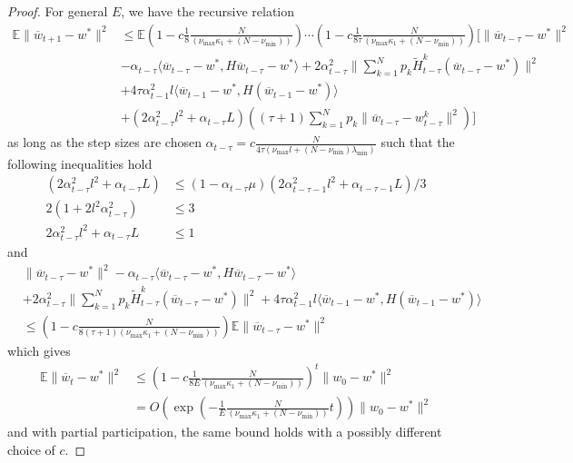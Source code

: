 \begin{proof}
	For general $E$, we have the recursive relation
	\begin{align*}
	\mathbb{E}\|\overline{w}_{t+1}-w^{\ast}\|^{2} & \leq\mathbb{E}(1-c\frac{1}{8}\frac{N}{(\nu_{\max}\kappa_{1}+(N-\nu_{\min}))})\cdots(1-c\frac{1}{8\tau}\frac{N}{(\nu_{\max}\kappa_{1}+(N-\nu_{\min}))})[\|\overline{w}_{t-\tau}-w^{\ast}\|^{2}\\
	& -\alpha_{t-\tau}\langle\overline{w}_{t-\tau}-w^{\ast},H\overline{w}_{t-\tau}-w^{\ast}\rangle+2\alpha_{t-\tau}^{2}\|\sum_{k=1}^{N}p_{k}\tilde{H}_{t-\tau}^{k}(\overline{w}_{t-\tau}-w^{\ast})\|^{2}\\
	& +4\tau\alpha_{t-1}^{2}l\langle\overline{w}_{t-1}-w^{\ast},H(\overline{w}_{t-1}-w^{\ast})\rangle\\
	& +(2\alpha_{t-\tau}^{2}l^{2}+\alpha_{t-\tau}L)((\tau+1)\sum_{k=1}^{N}p_{k}\|\overline{w}_{t-\tau}-w_{t-\tau}^{k}\|^{2})]
	\end{align*}
	as long as the step sizes are chosen $\alpha_{t-\tau}=c\frac{N}{4\tau(\nu_{\max}l+(N-\nu_{\min})\lambda_{\min})}$
	such that the following inequalities hold 
	\begin{align*}
	(2\alpha_{t-\tau}^{2}l^{2}+\alpha_{t-\tau}L) & \leq(1-\alpha_{t-\tau}\mu)(2\alpha_{t-\tau-1}^{2}l^{2}+\alpha_{t-\tau-1}L)/3\\
	2(1+2l^{2}\alpha_{t-\tau}^{2}) & \leq3\\
	2\alpha_{t-\tau}^{2}l^{2}+\alpha_{t-\tau}L & \leq1
	\end{align*}
	and 
	\begin{align*}
	& \|\overline{w}_{t-\tau}-w^{\ast}\|^{2}-\alpha_{t-\tau}\langle\overline{w}_{t-\tau}-w^{\ast},H\overline{w}_{t-\tau}-w^{\ast}\rangle\\
	& +2\alpha_{t-\tau}^{2}\|\sum_{k=1}^{N}p_{k}\tilde{H}_{t-\tau}^{k}(\overline{w}_{t-\tau}-w^{\ast})\|^{2}+4\tau\alpha_{t-1}^{2}l\langle\overline{w}_{t-1}-w^{\ast},H(\overline{w}_{t-1}-w^{\ast})\rangle\\
	& \leq(1-c\frac{N}{8(\tau+1)(\nu_{\max}\kappa_{1}+(N-\nu_{\min}))})\mathbb{E}\|\overline{w}_{t-\tau}-w^{\ast}\|^{2}
	\end{align*}
	which gives 
	\begin{align*}
	\mathbb{E}\|\overline{w}_{t}-w^{\ast}\|^{2} & \leq(1-c\frac{1}{8E}\frac{N}{(\nu_{\max}\kappa_{1}+(N-\nu_{\min}))})^{t}\|w_{0}-w^{\ast}\|^{2}\\
	& =O(\exp(-\frac{1}{E}\frac{N}{(\nu_{\max}\kappa_{1}+(N-\nu_{\min}))}t))\|w_{0}-w^{\ast}\|^{2}
	\end{align*}
	and with partial participation, the same bound holds with a possibly
	different choice of $c$. 
\end{proof}
	
